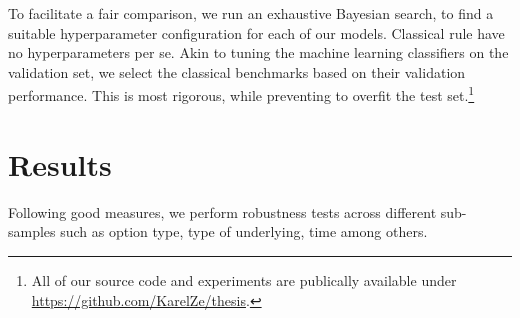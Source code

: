 To facilitate a fair comparison, we run an exhaustive Bayesian search, to find a suitable hyperparameter configuration for each of our models. Classical
rule have no hyperparameters per se. Akin to tuning the machine learning classifiers on the validation set, we select the classical benchmarks based on their validation performance. This is most rigorous, while preventing to overfit the test set.\footnote{All of our source code and experiments are publically available under \url{https://github.com/KarelZe/thesis}.}

\section{Results}

Following good measures, we perform robustness tests across different sub-samples such as option type, type of underlying, time among others. 



